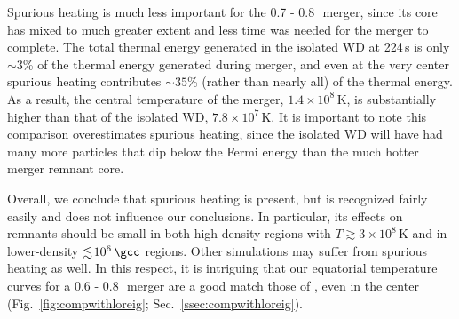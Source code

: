 Spurious heating is much less important for the 0.7 - 0.8\,\Msun\ merger, since its core has mixed to much greater extent and less time was needed for the merger to complete.  The total thermal energy generated in the isolated WD at 224\,s is only $\sim\!3$\% of the thermal energy generated during merger, and even at the very center spurious heating contributes $\sim\!35$\% (rather than nearly all) of the thermal energy.  As a result, the central temperature of the merger, $1.4 \times 10^8\,$K, is substantially higher than that of the isolated WD, $7.8 \times 10^7\,$K.  It is important to note this comparison overestimates spurious heating, since the isolated WD will have had many more particles that dip below the Fermi energy than the much hotter merger remnant core. 


Overall, we conclude that spurious heating is present, but is recognized fairly easily and does not influence our conclusions.  In particular, its effects on remnants should be small in both high-density regions with $T\gtrsim3\times10^8$\,K and in lower-density $\lesssim\!10^6\,\gcc$ regions.  Other simulations may suffer from spurious heating as well.  In this respect, it is intriguing that our equatorial temperature curves for a 0.6 - 0.8\,\Msun\ merger are a good match those of , even in the center (Fig.~\ref{fig:compwithloreig}; Sec.~\ref{ssec:compwithloreig}).


